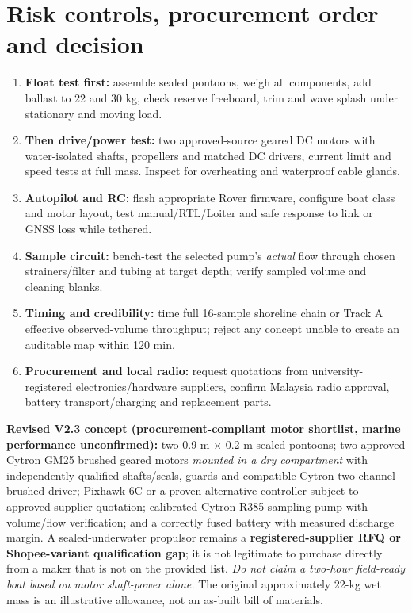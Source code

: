 \documentclass[10pt,a4paper]{article}
\begin{document}
\section{Risk controls, procurement order and decision}
\begin{enumerate}[leftmargin=*]
\item \textbf{Float test first:} assemble sealed pontoons, weigh all components, add ballast to 22 and 30 kg, check reserve freeboard, trim and wave splash under stationary and moving load.
\item \textbf{Then drive/power test:} two approved-source geared DC motors with water-isolated shafts, propellers and matched DC drivers, current limit and speed tests at full mass. Inspect for overheating and waterproof cable glands.
\item \textbf{Autopilot and RC:} flash appropriate Rover firmware, configure boat class and motor layout, test manual/RTL/Loiter and safe response to link or GNSS loss while tethered.
\item \textbf{Sample circuit:} bench-test the selected pump's \emph{actual} flow through chosen strainers/filter and tubing at target depth; verify sampled volume and cleaning blanks.
\item \textbf{Timing and credibility:} time full 16-sample shoreline chain or Track A effective observed-volume throughput; reject any concept unable to create an auditable map within 120 min.
\item \textbf{Procurement and local radio:} request quotations from university-registered electronics/hardware suppliers, confirm Malaysia radio approval, battery transport/charging and replacement parts.
\end{enumerate}
\textbf{Revised V2.3 concept (procurement-compliant motor shortlist, marine performance unconfirmed):} two 0.9-m $\times$ 0.2-m sealed pontoons; two approved Cytron GM25 brushed geared motors \emph{mounted in a dry compartment} with independently qualified shafts/seals, guards and compatible Cytron two-channel brushed driver; Pixhawk 6C or a proven alternative controller subject to approved-supplier quotation; calibrated Cytron R385 sampling pump with volume/flow verification; and a correctly fused battery with measured discharge margin. A sealed-underwater propulsor remains a \textbf{registered-supplier RFQ or Shopee-variant qualification gap}; it is not legitimate to purchase directly from a maker that is not on the provided list. \emph{Do not claim a two-hour field-ready boat based on motor shaft-power alone.} The original approximately 22-kg wet mass is an illustrative allowance, not an as-built bill of materials.
\end{document}
